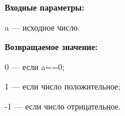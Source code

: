 \textbf{Входные параметры:}

 a --- исходное число.

\textbf{Возвращаемое значение:}

 0 --- если a==0;
 
 1 --- если число положительное;
 
 -1 --- если число отрицательное.
